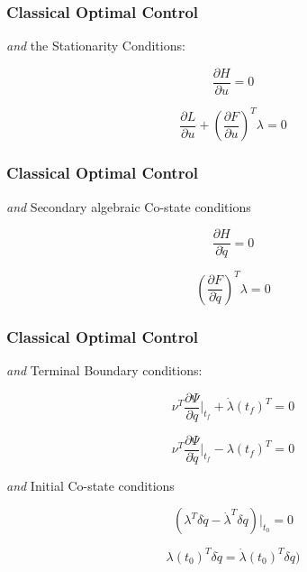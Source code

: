 \documentclass{beamer}
\begin{document}

\begin{frame}
\frametitle{Classical Optimal Control}

\textit{and} the Stationarity Conditions:

\begin{equation}
    \frac{\partial H}{\partial u} = 0
\end{equation}

\begin{equation}
    \frac{\partial L}{\partial u} +( \frac{\partial F}{\partial u} )^T \lambda = 0
\end{equation}

\end{frame}




\begin{frame}
\frametitle{Classical Optimal Control}

\textit{and} Secondary algebraic Co-state conditions

\begin{equation}
    \frac{\partial H}{\partial \dot q} = 0
\end{equation}

\begin{equation}
    (\frac{\partial F}{\partial \dot q})^T \lambda = 0
\end{equation}


\end{frame}




\begin{frame}
\frametitle{Classical Optimal Control}


\textit{and} Terminal Boundary conditions:

\begin{equation}
    \nu^T \frac{\partial \Psi}{\partial q}|_{t_f} + \dot \lambda(t_f)^T = 0
\end{equation}

\begin{equation}
    \nu^T \frac{\partial \Psi}{\partial \dot q}|_{t_f} - \lambda(t_f)^T = 0
\end{equation}


\textit{and} Initial Co-state conditions

\begin{equation}
    ( \lambda^T \delta \dot q - \dot \lambda^T \delta q )|_{t_0} = 0
\end{equation}

\begin{equation}
    \lambda(t_0)^T \delta \dot q = \dot \lambda(t_0)^T \delta q )
\end{equation}





\end{frame}
\end{document}
